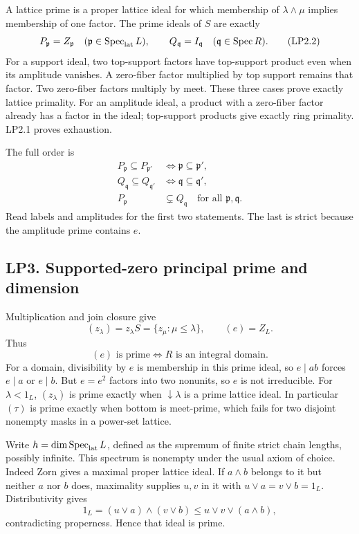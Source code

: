 A lattice prime is a proper lattice ideal for which membership of
\(\lambda\wedge\mu\) implies membership of one factor. The prime ideals
of \(S\) are exactly \[
P_{\mathfrak p}=Z_{\mathfrak p}\quad
(\mathfrak p\in\operatorname{Spec}_{\rm lat}L),\qquad
Q_{\mathfrak q}=I_{\mathfrak q}\quad
(\mathfrak q\in\operatorname{Spec}R).
\tag{LP2.2}
\] For a support ideal, two top-support factors have top-support product
even when its amplitude vanishes. A zero-fiber factor multiplied by top
support remains that factor. Two zero-fiber factors multiply by meet.
These three cases prove exactly lattice primality. For an amplitude
ideal, a product with a zero-fiber factor already has a factor in the
ideal; top-support products give exactly ring primality. LP2.1 proves
exhaustion.

The full order is \[
\begin{aligned}
P_{\mathfrak p}\subseteq P_{\mathfrak p'}&\iff\mathfrak p\subseteq\mathfrak p',\\
Q_{\mathfrak q}\subseteq Q_{\mathfrak q'}&\iff\mathfrak q\subseteq\mathfrak q',\\
P_{\mathfrak p}&\subsetneq Q_{\mathfrak q}\quad\text{for all }\mathfrak p,\mathfrak q.
\end{aligned}\tag{LP2.3}
\] Read labels and amplitudes for the first two statements. The last is
strict because the amplitude prime contains \(e\).

\subsection{LP3. Supported-zero principal prime and
dimension}\label{lp3.-supported-zero-principal-prime-and-dimension}

Multiplication and join closure give \[
(z_\lambda)=z_\lambda S=\{z_\mu:\mu\le\lambda\},\qquad
(e)=Z_L.
\tag{LP3.1}
\] Thus \[
(e)\text{ is prime}\iff R\text{ is an integral domain}.
\tag{LP3.2}
\] For a domain, divisibility by \(e\) is membership in this prime
ideal, so \(e\mid ab\) forces \(e\mid a\) or \(e\mid b\). But \(e=e^2\)
factors into two nonunits, so \(e\) is not irreducible. For
\(\lambda<1_L\), \((z_\lambda)\) is prime exactly when
\(\downarrow\lambda\) is a prime lattice ideal. In particular \((\tau)\)
is prime exactly when bottom is meet-prime, which fails for two disjoint
nonempty masks in a power-set lattice.

Write \(h=\dim\operatorname{Spec}_{\rm lat}L\), defined as the supremum
of finite strict chain lengths, possibly infinite. This spectrum is
nonempty under the usual axiom of choice. Indeed Zorn gives a maximal
proper lattice ideal. If \(a\wedge b\) belongs to it but neither \(a\)
nor \(b\) does, maximality supplies \(u,v\) in it with
\(u\vee a=v\vee b=1_L\). Distributivity gives \[
1_L=(u\vee a)\wedge(v\vee b)\le u\vee v\vee(a\wedge b),
\] contradicting properness. Hence that ideal is prime.

